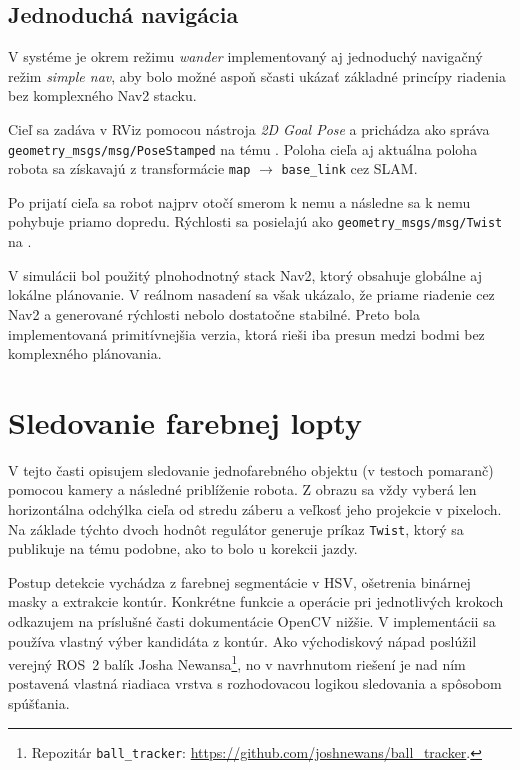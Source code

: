       
        \subsection*{Jednoduchá navigácia}
      
        V systéme je okrem režimu \emph{wander} implementovaný aj jednoduchý navigačný režim \emph{simple nav}, aby bolo možné aspoň sčasti ukázať 
        základné princípy riadenia bez komplexného Nav2 stacku.
      
        Cieľ sa zadáva v RViz pomocou nástroja \emph{2D Goal Pose} a prichádza ako správa \texttt{geometry\_msgs/msg/PoseStamped} na tému . Poloha cieľa aj aktuálna poloha robota sa získavajú z transformácie \texttt{map} $\rightarrow$ \texttt{base\_link} cez SLAM.
      
        Po prijatí cieľa sa robot najprv otočí smerom k nemu a následne sa k nemu pohybuje priamo dopredu. Rýchlosti sa posielajú ako \texttt{geometry\_msgs/msg/Twist} na .
      
        V simulácii bol použitý plnohodnotný stack Nav2, ktorý obsahuje globálne aj lokálne plánovanie. V reálnom nasadení sa však ukázalo, že priame riadenie cez Nav2 a generované rýchlosti nebolo dostatočne stabilné. Preto bola implementovaná primitívnejšia verzia, ktorá rieši iba presun medzi bodmi bez komplexného plánovania.
      
        \section{Sledovanie farebnej lopty}
        \label{sec:ball-follow-section}
      
        V tejto časti opisujem sledovanie jednofarebného objektu (v testoch pomaranč) pomocou kamery a následné priblíženie robota. Z obrazu sa vždy vyberá len horizontálna odchýlka cieľa od stredu záberu a veľkosť jeho projekcie v pixeloch. Na základe týchto dvoch hodnôt regulátor generuje príkaz \texttt{Twist}, ktorý sa publikuje na tému  podobne, ako to bolo u korekcii jazdy.
      
        Postup detekcie vychádza z farebnej segmentácie v HSV, ošetrenia binárnej masky a extrakcie kontúr. Konkrétne funkcie a operácie pri jednotlivých krokoch odkazujem na príslušné časti dokumentácie OpenCV nižšie. V implementácii sa používa vlastný výber kandidáta z kontúr. Ako východiskový nápad poslúžil verejný ROS~2 balík Josha Newansa\footnote{Repozitár \texttt{ball\_tracker}: \url{https://github.com/joshnewans/ball_tracker}.}, no v navrhnutom riešení je nad ním postavená vlastná riadiaca vrstva s rozhodovacou logikou sledovania a spôsobom spúšťania.
      
